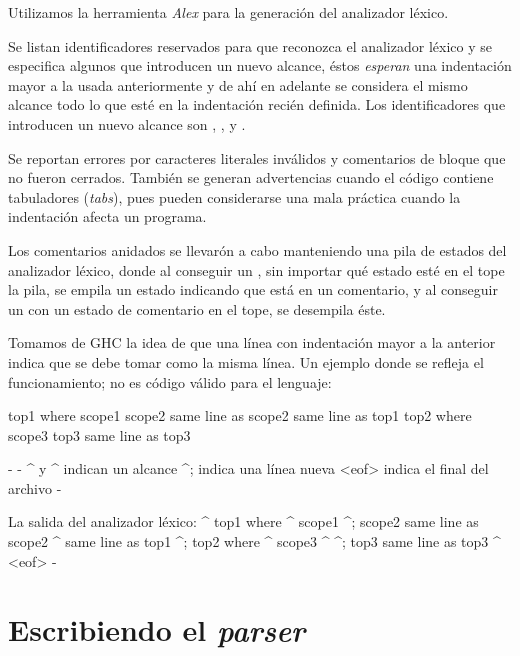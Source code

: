 {\begin{implementationfr}
Utilizamos la herramienta \emph{Alex} \cite{alex} para la generación del analizador léxico.

Se listan identificadores reservados para que reconozca el analizador léxico y se especifica algunos que introducen un nuevo alcance, éstos \emph{esperan} una indentación mayor a la usada anteriormente y de ahí en adelante se considera el mismo alcance todo lo que esté en la indentación recién definida. Los identificadores que introducen un nuevo alcance son , ,  y .

Se reportan errores por caracteres literales inválidos y comentarios de bloque que no fueron cerrados. También se generan advertencias cuando el código contiene tabuladores (\emph{tabs}), pues pueden considerarse una mala práctica cuando la indentación afecta un programa.

Los comentarios anidados se llevarón a cabo manteniendo una pila de estados del analizador léxico, donde al conseguir un \inlinecode{\{-}, sin importar qué estado esté en el tope la pila, se empila un estado indicando que está en un comentario, y al conseguir un \inlinecode{-\}} con un estado de comentario en el tope, se desempila éste.

Tomamos de GHC la idea de que una línea con indentación mayor a la anterior indica que se debe tomar como la misma línea. Un ejemplo donde se refleja el funcionamiento; no es código válido para el lenguaje:

\begin{anglercode}[deletekeywords={as}]
top1 where
        scope1
        scope2
            same line as scope2
    same line as top1
top2 where
    scope3
top3
    same line as top3

{-
    {-
        {^ y ^} indican un alcance
        ^;      indica una línea nueva
        <eof>   indica el final del archivo
    -}

    La salida del analizador léxico:
    {^
        top1 where {^
            scope1 ^;
            scope2 same line as scope2
        ^} same line as top1 ^;
        top2 where {^
            scope3
        ^} ^;
        top3 same line as top3
    ^} <eof>
-}
\end{anglercode}
\end{implementationfr}

\section{Escribiendo el \emph{parser}}

}
